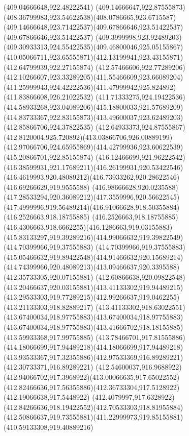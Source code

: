 {{{{				\closepath
				\moveto(409.04666648,922.48222541)
				\curveto(409.14666647,922.87555873)(408.36799983,923.54622538)(408.0786665,923.6715587)
				\curveto(409.14666648,923.71422537)(409.67866646,923.51422537)(409.67866646,923.51422537)
				\curveto(409.3999998,923.92489203)(409.30933313,924.55422535)(409.46800046,925.05155867)
				\curveto(410.05066711,923.65555871)(412.13199941,923.43155871)(412.64799939,922.27155874)
				\curveto(412.57466606,922.77289206)(412.10266607,923.33289205)(411.55466609,923.66089204)
				\curveto(411.25999943,924.42222536)(411.47999942,925.824892)(411.83866608,926.21022532)
				\curveto(411.71333275,924.19422536)(414.58933268,923.04089206)(415.18800033,921.57689209)
				\curveto(414.83733367,922.83155873)(413.49600037,923.62489203)(412.85866706,924.37822535)
				\curveto(412.64933373,924.87555867)(412.8120004,925.720892)(413.03866706,926.00889199)
				\curveto(412.97066706,924.65955869)(414.42799936,923.60622539)(415.20866701,922.85155874)
				\curveto(416.12466699,921.96222542)(416.38599931,921.17689211)(416.26199931,920.53422546)
				\curveto(416.4619993,920.48089212)(416.73933262,920.28622546)(416.69266629,919.9555588)
				\curveto(416.98666628,920.0235588)(417.28533294,920.36089212)(417.3559996,920.56622545)
				\curveto(417.4999996,919.56489214)(416.91066628,918.50355884)(416.2526663,918.18755885)
				\curveto(416.2526663,918.18755885)(416.4306663,918.6662255)(416.1286663,919.03155883)
				\curveto(415.83133297,919.39289216)(414.99066632,919.39822549)(414.70399966,919.37555883)
				\curveto(414.70399966,919.37555883)(415.05466632,919.89422548)(414.91466632,920.15689214)
				\curveto(414.74399966,920.48089213)(413.09466637,920.3395588)(412.35733305,920.07155881)
				\curveto(412.60866638,920.09822548)(413.20466637,920.03155881)(413.41133302,919.94489215)
				\curveto(413.29533303,919.77289215)(412.99266637,919.0462255)(413.21133303,918.82889217)
				\curveto(413.41133302,918.63022551)(413.67400034,918.97755883)(413.67400034,918.97755883)
				\curveto(413.67400034,918.97755883)(413.41666702,918.18155885)(413.59933368,917.99755885)
				\curveto(413.78466701,917.81555886)(414.18066699,917.94489218)(414.18066699,917.94489218)
				\curveto(413.93533367,917.32355886)(412.97533369,916.89289221)(412.30733371,916.89289221)
				\curveto(412.54600037,916.9688922)(412.94066702,917.3968922)(413.00066635,917.65022552)
				\curveto(412.82466636,917.56355886)(412.36733304,917.5128922)(412.19066638,917.5448922)
				\curveto(412.4079997,917.6328922)(412.84266636,918.19422552)(412.70533303,918.81955884)
				\curveto(412.50866637,919.73555881)(411.22999973,919.85155881)(410.59133308,919.40889216)
}}}}
